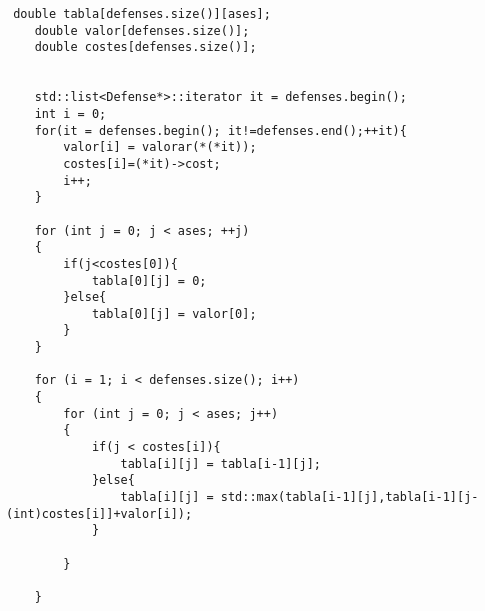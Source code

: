 \begin{lstlisting}
 double tabla[defenses.size()][ases];
    double valor[defenses.size()];
    double costes[defenses.size()];


    std::list<Defense*>::iterator it = defenses.begin();
    int i = 0;
    for(it = defenses.begin(); it!=defenses.end();++it){
        valor[i] = valorar(*(*it));
        costes[i]=(*it)->cost;
        i++;
    }

    for (int j = 0; j < ases; ++j)
    {
        if(j<costes[0]){
            tabla[0][j] = 0;
        }else{
            tabla[0][j] = valor[0];
        }
    }

    for (i = 1; i < defenses.size(); i++)
    {
        for (int j = 0; j < ases; j++)
        {
            if(j < costes[i]){
                tabla[i][j] = tabla[i-1][j];
            }else{
                tabla[i][j] = std::max(tabla[i-1][j],tabla[i-1][j-(int)costes[i]]+valor[i]);
            }
            
        }
        
    }
\end{lstlisting}

